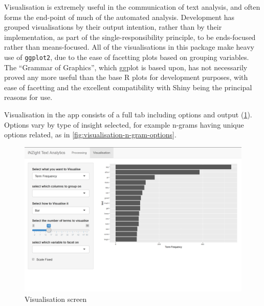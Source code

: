 \message{ !name(jason-cairns-dissertation.tex)}\documentclass[11pt, a4paper, titlepage]{report}
\begin{document}
Visualisation is extremely useful in the communication of text
analysis, and often forms the end-point of much of the automated
analysis. Development has grouped visualisations by their output
intention, rather than by their implementation, as part of the
single-responsibility principle, to be ends-focused rather than
means-focused. All of the visualisations in this package make heavy
use of \texttt{ggplot2}, due to the ease of facetting plots
based on grouping variables. The ``Grammar of Graphics'', which ggplot
is based upon, has not necessarily proved any more useful than the
base R plots for development purposes, with ease of facetting and the
excellent compatibility with Shiny being the principal reasons for
use.

Visualisation in the app consists of a full tab including options and
output (\cref{fig:visualisation-overview}). Options vary by type of
insight selected, for example n-grams having unique options related,
as in \cref{fig:visualisation-n-gram-options}.

\begin{figure}
\centering
\includegraphics[scale=0.35]{visualisation-overview.png}
\caption{Visualisation screen\label{fig:visualisation-overview}}
\end{figure}
\end{document}
